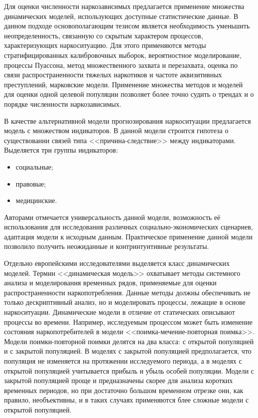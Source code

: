\documentclass[a4paper,14pt]{article}
\begin{document}
Для оценки численности наркозависимых предлагается применение множества
динамических моделей, использующих доступные статистические данные. В данном
подходе основополагающим тезисом является необходимость уменьшить
неопределенность, связанную со скрытым характером процессов, характеризующих
наркоситуацию. Для этого применяются методы стратифицированных калибровочных
выборок, вероятностное моделирование, процессы Пуассона, метод множественного
захвата и перезахвата, оценка по связи распространенности тяжелых наркотиков и
частоте аквизитивных преступлений, марковские модели. Применение множества
методов и моделей для оценки одной целевой популяции позволяет более точно
судить о трендах и о порядке численности наркозависимых. 

В качестве альтернативной модели прогнозирования наркоситуации предлагается
модель с множеством индикаторов. В данной модели строится гипотеза о
существовании связей типа <<причина-следствие>> между индикаторами. Выделяется
три группы индикаторов: 
\begin{itemize}
    \item социальные;
    \item правовые;
    \item медицинские.
\end{itemize}
Авторами отмечается универсальность данной модели, возможность её использования
для исследования различных социально-экономических сценариев, адаптация модели к
исходным данным. Практическое применение данной модели позволило получить
неожиданные и контринтуитивные результаты. 

Отдельно европейскими исследователями выделяется класс динамических моделей.
Термин <<динамическая модель>> охватывает методы системного анализа и
моделирования временных рядов, применяемые для оценки распространенности
наркопотребления. Данные методы должны обеспечивать не только дескриптивный
анализ, но и моделировать процессы, лежащие в основе наркоситуации. Динамические
модели в отличие от статических описывают процессы во времени. Например,
исследуемым процессом может быть изменение состояния наркопотребителей в модели
<<поимка-мечение-повторная поимка>>. Модели поимки-повторной поимки делятся на
два класса: с открытой популяцией и с закрытой популяцией. В моделях с закрытой
популяцией предполагается, что популяция не изменяется на протяжении
исследуемого периода, а в моделях с открытой популяцией учитывается прибыль и
убыль особей популяции. Модели с закрытой популяцией проще и предназначены
скорее для анализа коротких временных периодов, но при достаточно большом
временном отрезке они, как правило, необъективны, и в таких случаях применяются
блее сложные модели с открытой популяцией.
\end{document}
